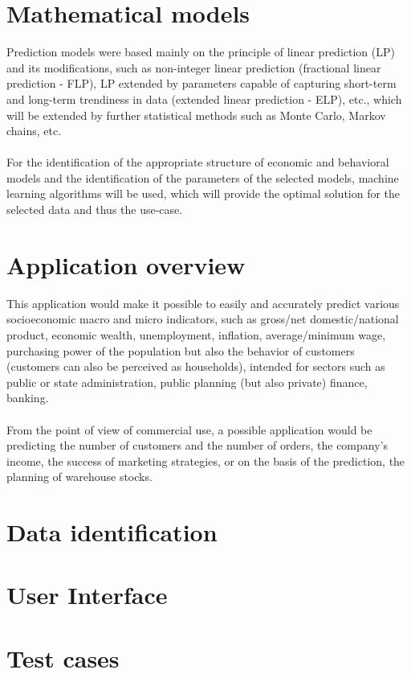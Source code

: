 \documentclass[12pt]{article}
\begin{document}
        \section{Mathematical models}
        Prediction models were based mainly on the principle of linear prediction (LP) and its modifications, such as non-integer linear prediction (fractional linear prediction - FLP), LP extended by parameters capable of capturing short-term and long-term trendiness in data (extended linear prediction - ELP), etc., which will be extended by further statistical methods such as Monte Carlo, Markov chains, etc.\\
        \\
        For the identification of the appropriate structure of economic and behavioral models and the identification of the parameters of the selected models, machine learning algorithms will be used, which will provide the optimal solution for the selected data and thus the use-case.
        \section{Application overview}
        This application would make it possible to easily and accurately predict various socioeconomic macro and micro indicators, such as gross/net domestic/national product, economic wealth, unemployment, inflation, average/minimum wage, purchasing power of the population but also the behavior of customers (customers can also be perceived as households), intended for sectors such as public or state administration, public planning (but also private) finance, banking.\\
        \\
        From the point of view of commercial use, a possible application would be predicting the number of customers and the number of orders, the company's income, the success of marketing strategies, or on the basis of the prediction, the planning of warehouse stocks.
        \section{Data identification}
        \section{User Interface}
        \section{Test cases}
        
\end{document}
